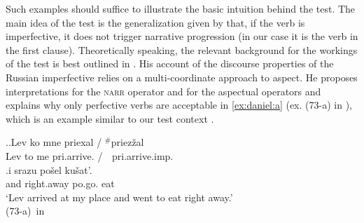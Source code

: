 Such examples should suffice to illustrate the basic intuition behind the test. The main idea of the test is the generalization given by \citet{Jespersen:24} that, if the verb is imperfective, it does not trigger narrative progression (in our case it is the verb in the first clause). Theoretically speaking, the relevant background for the workings of the test is best outlined in \citet{Altshuler:12}.
His account of the discourse properties of the Russian imperfective  relies on a multi-coordinate approach to aspect. He proposes interpretations for the \textsc{narr} operator and for the aspectual operators and explains why only perfective verbs  are acceptable in \ref{ex:daniel:a} (ex. (73-a) in \citealt{Altshuler:12}), which is an example similar to our test context  .

\ex.\label{ex:daniel}\ag.\label{ex:daniel:a}Lev ko mne \textsuperscript{\JudgeOK}priexal\textsuperscript{\PF} / {{$^{\#}$}priez\v{z}al\textsuperscript{\IPF}}\\
Lev to me {pri.arrive.} / {{\textcolor{white} {$^{\#}$}}pri.arrive.imp.}\\
\bg.i srazu po\v{s}el\textsuperscript{\PF} ku\v{s}at'.\\
and right.away po.go. eat\\
\trans `Lev arrived at my place and went to eat right away.'\\
\hbox{}\hfill\hbox{(73-a) in \citet{Altshuler:12}}


